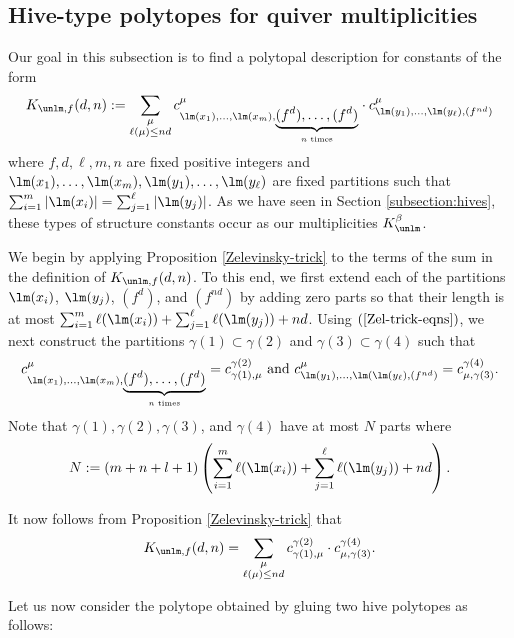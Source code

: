 \subsection{Hive-type polytopes for quiver multiplicities} \label{hives-semi-invs-section}
Our goal in this subsection is to find a polytopal description for constants of the form
\[
K_{\unlm, f}(d,n) := \sum_{\substack{\mu \\ \ell(\mu) \leq nd}} c^\mu_{\lm(x_1),\ldots, \lm(x_m), \underbrace{(f^d),\ldots, (f^d)}_{n \text{ times}}} \cdot c^\mu_{\lm(y_1),\ldots, \lm(y_\ell),(f^{nd})}
\]
where $f, d, \ell, m,n$ are fixed positive integers and $\lm(x_1),\ldots, \lm(x_m), \lm(y_1),\ldots, \lm(y_\ell)$ are fixed partitions such that $\sum_{i=1}^m |\lm(x_i)| = \sum_{j=1}^\ell |\lm(y_j)|$. As we have seen in Section \ref{subsection:hives}, these types of structure constants occur as our multiplicities $K^{\beta}_{\unlm}$.

We begin by applying Proposition \ref{Zelevinsky-trick} to the terms of the sum in the definition of $K_{\unlm, f}(d,n)$. To this end,  we first extend each of the partitions $\lm(x_i)$, $\lm(y_j)$, $(f^d)$, and $(f^{nd})$ by adding zero parts so that their length is at most $\sum_{i=1}^m \ell(\lm(x_i))+\sum_{j=1}^\ell \ell(\lm(y_j))+nd$. Using $(\ref{Zel-trick-eqns})$, we next construct the partitions $\gamma(1) \subset \gamma(2)$ and $\gamma(3)\subset \gamma(4)$ such that 
\begin{equation}\label{partitions-gamma-from-Zele-trick}
c^\mu_{\lm(x_1),\ldots, \lm(x_m), \underbrace{(f^d),\ldots, (f^d)}_{n \text{ times}}}=c^{\gamma(2)}_{\gamma(1),\mu} \text{~and~} c^\mu_{\lm(y_1),\ldots, \lm(\lm(y_\ell),(f^{nd})}=c^{\gamma(4)}_{\mu,\gamma(3)}.
\end{equation}
Note that $\gamma(1), \gamma(2), \gamma(3)$, and $\gamma(4)$ have at most $N$ parts where 
$$
N:=(m+n+l+1)\left( \sum_{i=1}^m \ell(\lm(x_i))+\sum_{j=1}^\ell \ell(\lm(y_j))+nd \right).
$$

It now follows from Proposition \ref{Zelevinsky-trick} that 
\[
K_{\unlm, f}(d,n) = \sum_{\substack{\mu \\ \ell(\mu) \leq nd}} c^{\gamma(2)}_{\gamma(1),\mu} \cdot c^{\gamma(4)}_{\mu,\gamma(3)}.
\]

Let us now consider the polytope obtained by gluing two hive polytopes as follows:


